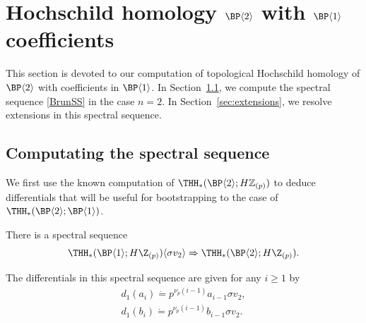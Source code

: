 \section{Hochschild homology  \texorpdfstring{$\BP\langle 2\rangle$}{BP2} with \texorpdfstring{$\BP\langle 1\rangle$}{BP1} coefficients}
This section is devoted to our computation of topological Hochschild homology of $\BP\langle 2\rangle$ with coefficients in $\BP\langle 1\rangle$. In Section~\ref{sec:SS}, we compute the spectral sequence \eqref{BrunSS} in the case $n=2$. In Section~\ref{sec:extensions}, we resolve extensions in this spectral sequence. 

\subsection{Computating the spectral sequence}\label{sec:SS}

We first use the known computation of $\THH_*(\BP\langle 2\rangle;H\mathbb{Z}_{(p)})$ to deduce differentials that will be useful for bootstrapping to the case of $\THH_*(\BP\langle 2\rangle;\BP\langle 1\rangle)$.

\begin{proposition}
  There is a spectral sequence
  \begin{equation}
    \THH_*(\BP\langle 1\rangle; H \Z_{(p)}) \langle \sigma v_2 \rangle \Rightarrow \THH_*(\BP \langle 2 \rangle; H \Z_{(p)}).
  \end{equation}

  The differentials in this spectral sequence are given for any $i \geq 1$ by
  \begin{equation}
    \begin{gathered}
      d_1(a_i) \dot{=} p^{\nu_p(i-1)} a_{i-1} \sigma v_2, \\
      d_1(b_i) \dot{=} p^{\nu_p(i-1)} b_{i-1} \sigma v_2.
    \end{gathered}
  \end{equation}
\end{proposition}

